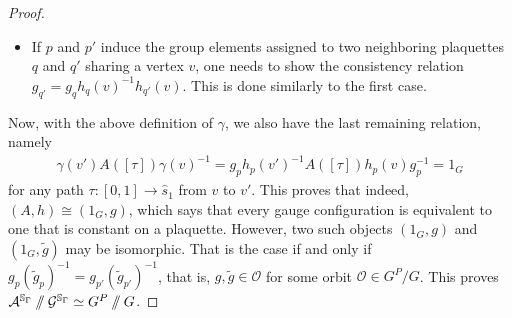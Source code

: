 \documentclass[pdftex]{sigma}
\newcommand{\sslash}{\mathbin{/\mkern-6mu/}}
\numberwithin{equation}{section}
\theoremstyle{definition}
\begin{document}
\begin{proof}
\begin{itemize}
 Choose a sequence of plaquettes $p = p_0, \dots, p_{\ell} = p'$, forming a path in the connected graph $\Gamma^*$ with $p_i$ and $p_{i+1}$ sharing the vertex $v_{i+1}$, and choose paths $\delta_i\colon [0,1] \rightarrow \hat{p_i}$ starting at $v_i$ and ending at $v_{i+1}$. Here, our notation is such that $v_0 = v$ and $v_{\ell+1} = v'$. Since $A([\delta_i])h_{p_i}(v_i) = h_{p_i}(v_{i+1})$, the relations imply that setting $\delta = \delta_{\ell} \star \dots \star \delta_0$ gives the desired path. As $\pi_1\left(\hat{s}_1\right)$ is trivial, the path $\delta$ is homotopy equivalent relative to its endpoints to a~path in $\mathrm{cl}(q)$ that lifts to a~path $\sigma$ with $\mathrm{im} (\sigma) \subset \hat{q}$ and $A([\sigma])h_q(v) = h_q(v')$. We find
 \begin{align*}
 g_q = g_{p'}h_{p'}(v')^{-1}A([\delta])h_{q}(v) = g_{p'}h_{p'}(v')^{-1}A([\sigma])h_{q}(v) = g_{p'}h_{p'}(v')^{-1}h_{q}(v'),
 \end{align*}
 showing that both $p$ and $p'$ induce the same group element for $q$.
 \item If $p$ and $p'$ induce the group elements assigned to two neighboring plaquettes $q$ and $q'$ sharing a vertex $v$, one needs to show the consistency relation $g_{q'} = g_q h_q(v)^{-1}h_{q'}(v)$. This is done similarly to the first case.
\end{itemize}
Now, with the above definition of $\gamma$, we also have the last remaining relation, namely
\begin{align*}
 \gamma(v')A([\tau])\gamma(v)^{-1} = g_ph_p(v')^{-1}A([\tau])h_p(v)g_p^{-1} = 1_G
\end{align*}
for any path $\tau\colon [0,1] \rightarrow \hat{s}_1$ from $v$ to $v'$. This proves that indeed, $(A,h) \cong (1_G, g)$, which says that every gauge configuration is equivalent to one that is constant on a plaquette. However, two such objects $(1_G, g)$ and $(1_G, \widetilde{g})$ may be isomorphic. That is the case if and only if $g_p(\widetilde{g}_{p})^{-1} = g_{p'}(\widetilde{g}_{p'})^{-1}$, that is, $g, \widetilde{g} \in \mathcal{O}$ for some orbit $\mathcal{O} \in G^P/G$. This proves $\mathcal{A}^{\mathbb{S}_{\Gamma}} \sslash \mathcal{G}^{\mathbb{S}_{\Gamma}} \simeq G^P \sslash G$.


\end{proof}
\end{document}
